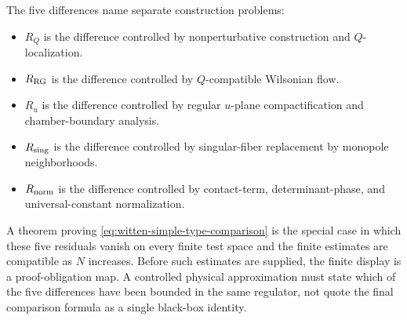 The five differences name separate construction problems:
\begin{itemize}
\item \(R_Q\) is the difference controlled by nonperturbative construction and
\(Q\)-localization.
\item \(R_{\rm RG}\) is the difference controlled by \(Q\)-compatible
Wilsonian flow.
\item \(R_u\) is the difference controlled by regular \(u\)-plane
compactification and chamber-boundary analysis.
\item \(R_{\rm sing}\) is the difference controlled by singular-fiber
replacement by monopole neighborhoods.
\item \(R_{\rm norm}\) is the difference controlled by contact-term,
determinant-phase, and universal-constant normalization.
\end{itemize}
A theorem proving
\eqref{eq:witten-simple-type-comparison} is the special case in which these
five residuals vanish on every finite test space and the finite estimates are
compatible as \(N\) increases.  Before such estimates are supplied, the finite
display is a proof-obligation map.  A controlled physical approximation must
state which of the five differences have been bounded in the same regulator,
not quote the final comparison formula as a single black-box identity.


